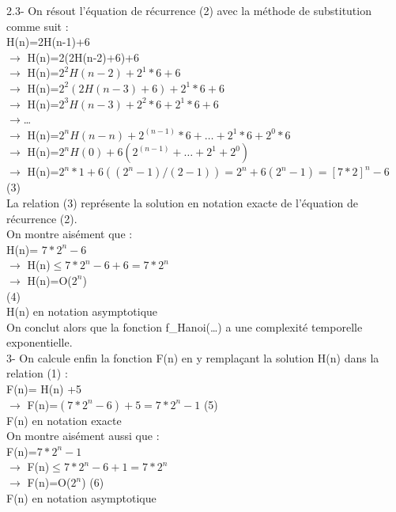 \documentclass[12pt]{article}
\begin{document}
2.3- On résout l'équation de récurrence (2) avec la méthode de substitution comme suit :\\
H(n)=2H(n-1)+6            \\ 
$\rightarrow$ H(n)=2(2H(n-2)+6)+6   \\          
$\rightarrow$ H(n)=$2^2 H(n-2)+2^1*6+6 $  \\   
$\rightarrow$ H(n)=$2^2 (2H(n-3)+6)+2^1*6+6 $ \\          
$\rightarrow$ H(n)=$2^3 H(n-3)+2^2*6+2^1*6+6 $\\
$\rightarrow$…\\
$\rightarrow$ H(n)=$2^n H(n-n) + 2^(n-1)*6+…+2^1*6+2^0*6$\\
$\rightarrow$ H(n)=$2^n H(0)  + 6(2^(n-1)+…+2^1+2^0)$\\

$\rightarrow$ H(n)=$2^n*1+6((2^n-1)/(2-1))=2^n+6(2^n-1)=[7*2]^n-6	$		(3)\\
La relation (3) représente la solution en notation exacte de l'équation de récurrence (2).\\

On montre aisément que :\\
H(n)= $7*2^n-6$       \\
$\rightarrow$ H(n)$\le 7*2^n-6+6=7*2^n$\\
$\rightarrow$ H(n)=O($2^n$)       \\          							(4)\\
H(n) en notation asymptotique\\

On conclut alors que la fonction f\_Hanoi(…) a une complexité temporelle exponentielle.\\

3- On calcule enfin la fonction F(n) en y remplaçant la solution H(n) dans la relation (1) :\\
F(n)= H(n) +5\\
$\rightarrow$ F(n)=$(7*2^n-6)+5= 7*2^n-1$         					(5)\\
F(n) en notation exacte\\

On montre aisément aussi que :\\
F(n)=$ 7*2^n-1$       \\
$\rightarrow$ F(n)$\le 7*2^n-6+1= 7*2^n$\\
$\rightarrow$ F(n)=O($2^n$)                 							(6)\\
F(n) en notation asymptotique\\
\end{document}
